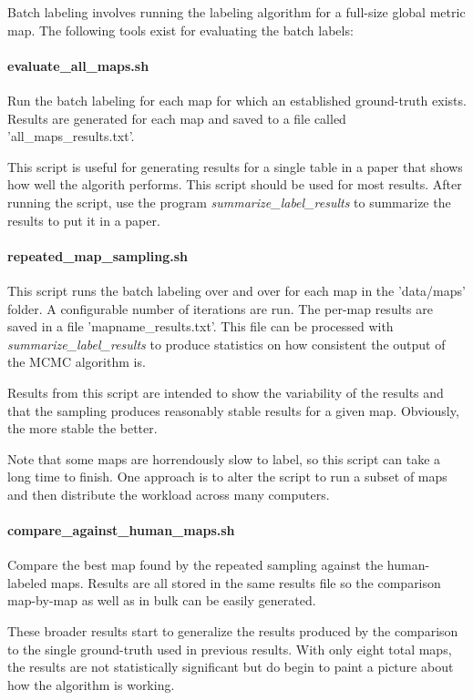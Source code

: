 \documentclass{article}
\begin{document}
Batch labeling involves running the labeling algorithm for a full-size global metric map. The following tools exist
for evaluating the batch labels:

\paragraph{evaluate\_all\_maps.sh}

Run the batch labeling for each map for which an established ground-truth exists. Results are generated for each map 
and saved to a file called 'all\_maps\_results.txt'.

This script is useful for generating results for a single table in a paper that shows how well the algorith performs.
This script should be used for most results. After running the script, use the program \emph{summarize\_label\_results}
to summarize the results to put it in a paper.

\paragraph{repeated\_map\_sampling.sh}

This script runs the batch labeling over and over for each map in the 'data/maps' folder. A configurable number of
iterations are run. The per-map results are saved in a file 'mapname\_results.txt'. This file can be processed
with \emph{summarize\_label\_results} to produce statistics on how consistent the output of the MCMC algorithm is.

Results from this script are intended to show the variability of the results and that the sampling produces
reasonably stable results for a given map. Obviously, the more stable the better.

Note that some maps are horrendously slow to label, so this script can take a long time to finish. One approach is
to alter the script to run a subset of maps and then distribute the workload across many computers.

\paragraph{compare\_against\_human\_maps.sh}

Compare the best map found by the repeated sampling against the human-labeled maps. Results are all stored in the
same results file so the comparison map-by-map as well as in bulk can be easily generated.

These broader results start to generalize the results produced by the comparison to the single ground-truth used in
previous results. With only eight total maps, the results are not statistically significant but do begin to paint
a picture about how the algorithm is working.
\end{document}

